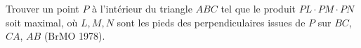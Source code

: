 Trouver un point $P$ à l'intérieur du triangle $ABC$ tel que le produit $PL \cdot PM \cdot PN$ soit maximal, où $L, M, N$ sont les pieds des perpendiculaires issues de $P$ sur $BC$, $CA$, $AB$ (BrMO 1978).
